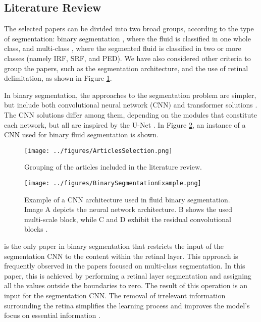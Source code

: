 \subsection{Literature Review}\label{FluidSegmentationLiteratureReview}
The selected papers can be divided into two broad groups, according to the type of segmentation: binary segmentation \parencite{Quek2022, Pawan2021, Liu2021, Guo2020, Wang2021, Wu2023}, where the fluid is classified in one whole class, and multi-class \parencite{Rahil2023, Hassan2021a, Zhang2023, Sappa2021, Xing2022, Tang2022, Padilla2022, Hu2019, Mantel2021, Liu2024, Li2023, Gao2019, Hassan2021b, Lu2019}, where the segmented fluid is classified in two or more classes (namely IRF, SRF, and PED). We have also considered other criteria to group the papers, such as the segmentation architecture, and the use of retinal delimitation, as shown in Figure \ref{fig:ArticlesSelection}.
\par
In binary segmentation, the approaches to the segmentation problem are simpler, but include both convolutional neural network (CNN) \parencite{Pawan2021, Liu2021, Guo2020, Wang2021, Wu2023} and transformer solutions \parencite{Quek2022}. The CNN solutions differ among them, depending on the modules that constitute each network, but all are inspired by the U-Net \parencite{Ronneberger2015}. In Figure \ref{fig:BinarySegmentationExample}, an instance of a CNN used for binary fluid segmentation is shown.
\begin{figure}[!ht]
	\centering
	\texttt{[image: ../figures/ArticlesSelection.png]}
	\caption{Grouping of the articles included in the literature review.}
	\label{fig:ArticlesSelection}
\end{figure}
\begin{figure}[!ht]
	\centering
	\texttt{[image: ../figures/BinarySegmentationExample.png]}
	\caption{Example of a CNN architecture used in fluid binary segmentation. Image A depicts the neural network architecture. B shows the used multi-scale block, while C and D exhibit the residual convolutional blocks \cite{Guo2020}.}
	\label{fig:BinarySegmentationExample}
\end{figure}
\par
\textcite{Pawan2021} is the only paper in binary segmentation that restricts the input of the segmentation CNN to the content within the retinal layer. This approach is frequently observed in the papers focused on multi-class segmentation. In this paper, this is achieved by performing a retinal layer segmentation and assigning all the values outside the boundaries to zero. The result of this operation is an input for the segmentation CNN. The removal of irrelevant information surrounding the retina simplifies the learning process and improves the model's focus on essential information \cite{Mantel2021}.
